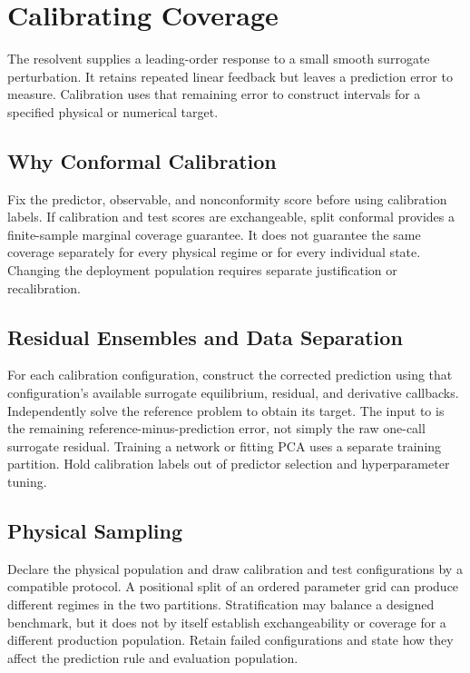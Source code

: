 \chapter{Calibrating Coverage}
\label{ch:coverage}
The resolvent supplies a leading-order response to a small smooth surrogate
perturbation. It retains repeated linear feedback but leaves a prediction
error to measure. Calibration uses that remaining error to construct intervals
for a specified physical or numerical target.

\section{Why Conformal Calibration}
\label{sec:why-conformal}
Fix the predictor, observable, and nonconformity score before using calibration
labels. If calibration and test scores are exchangeable, split conformal provides
a finite-sample marginal coverage guarantee. It does not guarantee the same
coverage separately for every physical regime or for every individual state.
Changing the deployment population requires separate justification or recalibration.

\section{Residual Ensembles and Data Separation}
\label{sec:residual-ensemble}
For each calibration configuration, construct the corrected prediction using
that configuration's available surrogate equilibrium, residual, and derivative
callbacks. Independently solve the reference problem to obtain its target.
The input to  is the remaining reference-minus-prediction
error, not simply the raw one-call surrogate residual.
Training a network or fitting PCA uses a separate training partition.
Hold calibration labels out of predictor selection and hyperparameter tuning.

\section{Physical Sampling}
\label{sec:stratified-sampling}
Declare the physical population and draw calibration and test configurations by
a compatible protocol. A positional split of an ordered parameter grid can
produce different regimes in the two partitions. Stratification may balance a
designed benchmark, but it does not by itself establish exchangeability or
coverage for a different production population. Retain failed configurations
and state how they affect the prediction rule and evaluation population.

